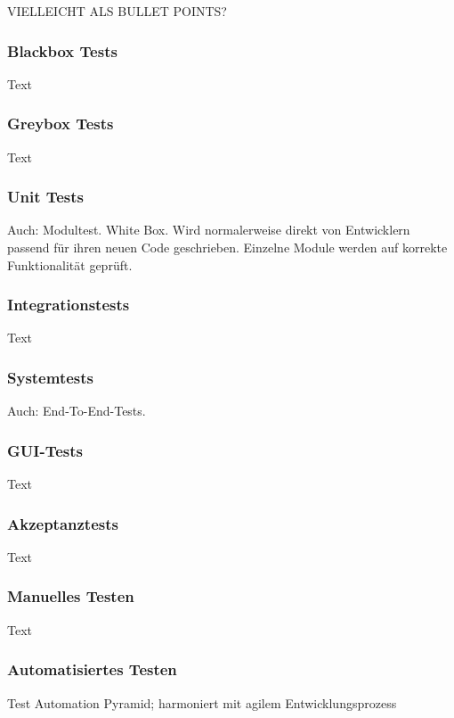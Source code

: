 VIELLEICHT ALS BULLET POINTS?

\subsubsection*{Blackbox Tests}\label{subsubsec:blackbox}
Text

\subsubsection*{Greybox Tests}\label{subsubsec:greybox}
Text

\subsubsection*{Unit Tests}\label{subsubsec:unittest}
Auch: Modultest. White Box. Wird normalerweise direkt von Entwicklern passend für ihren neuen Code geschrieben. Einzelne Module werden auf korrekte Funktionalität geprüft. \cite[S. 75]{witte:2019}

\subsubsection*{Integrationstests} \label{subsubsec:integrationstests}
Text

\subsubsection*{Systemtests}\label{subsubsec:e2etests}
Auch: End-To-End-Tests.

\subsubsection*{GUI-Tests}\label{subsubsec:guitests}
Text

\subsubsection*{Akzeptanztests}\label{subsubsec:akzeptanztests}
Text

\subsubsection*{Manuelles Testen}\label{subsubsec:manuelltest}
Text

\subsubsection*{Automatisiertes Testen}\label{subsubsec:autotest}
Test Automation Pyramid; harmoniert mit agilem Entwicklungsprozess \cite{contan:2018}

